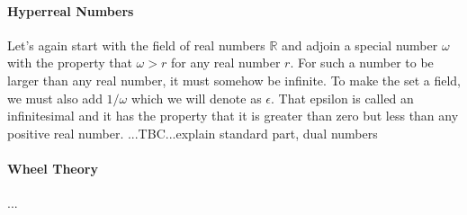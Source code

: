 

\paragraph{Hyperreal Numbers} Let's again start with the field of real numbers $\mathbb{R}$ and adjoin a special number $\omega$ with the property that $\omega > r$ for any real number $r$. For such a number to be larger than any real number, it must somehow be infinite. To make the set a field, we must also add $1/\omega$ which we will denote as $\epsilon$. That epsilon is called an infinitesimal and it has the property that it is greater than zero but less than any positive real number.  ...TBC...explain standard part, dual numbers

\paragraph{Wheel Theory}...





